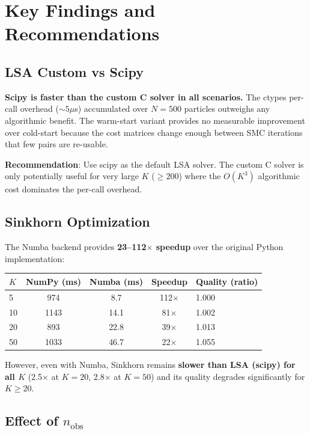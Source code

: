 \documentclass[11pt,a4paper]{article}
\begin{document}
\section{Key Findings and Recommendations}
\label{sec:findings}

\subsection{LSA Custom vs Scipy}

\textbf{Scipy is faster than the custom C solver in all scenarios.} The ctypes per-call overhead ($\sim 5\mu$s) accumulated over $N=500$ particles outweighs any algorithmic benefit. The warm-start variant provides no measurable improvement over cold-start because the cost matrices change enough between SMC iterations that few pairs are re-usable.

\textbf{Recommendation}: Use scipy as the default LSA solver. The custom C solver is only potentially useful for very large $K$ ($\ge 200$) where the $O(K^3)$ algorithmic cost dominates the per-call overhead.

\subsection{Sinkhorn Optimization}

The Numba backend provides \textbf{23--112$\times$ speedup} over the original Python implementation:
\begin{center}
\begin{tabular}{lcccl}
\toprule
$K$ & NumPy (ms) & Numba (ms) & Speedup & Quality (ratio) \\
\midrule
5   & 974  & 8.7  & 112$\times$ & 1.000 \\
10  & 1143 & 14.1 & 81$\times$  & 1.002 \\
20  & 893  & 22.8 & 39$\times$  & 1.013 \\
50  & 1033 & 46.7 & 22$\times$  & 1.055 \\
\bottomrule
\end{tabular}
\end{center}

However, even with Numba, Sinkhorn remains \textbf{slower than LSA (scipy) for all $K$} (2.5$\times$ at $K=20$, 2.8$\times$ at $K=50$) and its quality degrades significantly for $K \ge 20$.

\subsection{Effect of $n_{\text{obs}}$}
\end{document}
